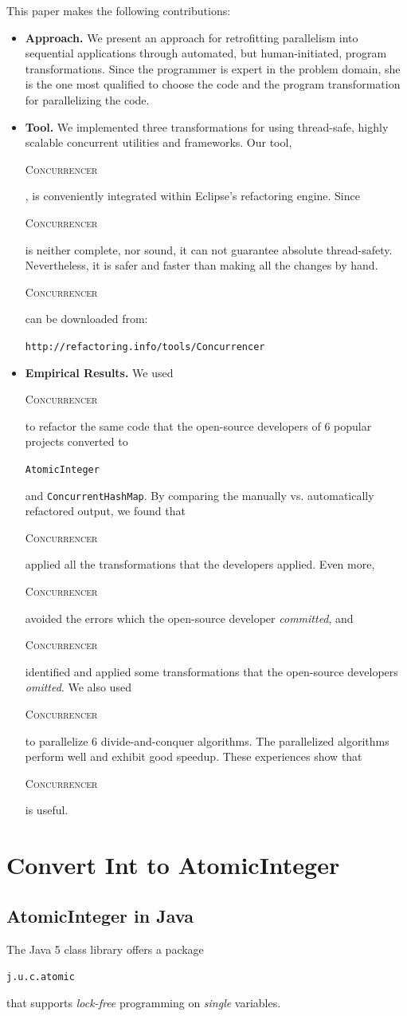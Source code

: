 \documentclass[10pt,twocolumn]{article}
\newcommand{\tool}{\begin{scriptsize}\textsc{Concurrencer}\end{scriptsize}\xspace}
\newcommand{\code}[1]{\begin{smaller}\texttt{#1}\end{smaller}}
\newcommand{\codex}[1]{{\smaller\texttt{#1}}\xspace}
\newcommand{\ConcurrentHashMap}{\codex{Con\-cur\-rent\-Hash\-Map}}
\begin{document}
This paper makes the following contributions:
\begin{itemize}
  \item {\textbf {Approach.}} We present an approach for
  retrofitting parallelism into sequential applications through
  automated, but human-initiated, program transformations. Since the
  programmer is expert in the problem domain, she is the one most qualified to
  choose the code and the program transformation for parallelizing the code.
  
  \item {\textbf {Tool.}} We implemented three transformations for using
  thread-safe, highly scalable concurrent utilities and frameworks. Our
  tool, \tool, is conveniently integrated within Eclipse's refactoring engine.
  Since \tool is neither complete, nor sound, it can not guarantee absolute
  thread-safety. Nevertheless, it is safer and faster than making all the
  changes by hand. \tool can be downloaded from:  \\
   \code{http://refactoring.info/tools/Concurrencer}   
  
  \item {\textbf {Empirical Results.}} We used \tool to refactor the same
  code that the open-source developers of 6 popular projects converted to 
  \code{AtomicInteger} and \ConcurrentHashMap. By comparing the manually
  vs. automatically refactored output, we found that \tool applied all the
  transformations that the developers applied. Even more, \tool avoided
  the errors which the open-source developer \emph{committed}, and \tool
  identified and applied some transformations that the open-source developers
  \emph{omitted}. We also used \tool to parallelize 6 divide-and-conquer
  algorithms. The parallelized algorithms perform well and exhibit good speedup. These
  experiences show that \tool is useful.
\end{itemize}



\section{Convert Int to AtomicInteger}

\subsection{AtomicInteger in Java}
The Java 5 class library
offers a package \code{j.u.c.atomic} that
supports \emph{lock-free} programming on \emph{single} variables. 
\end{document}

